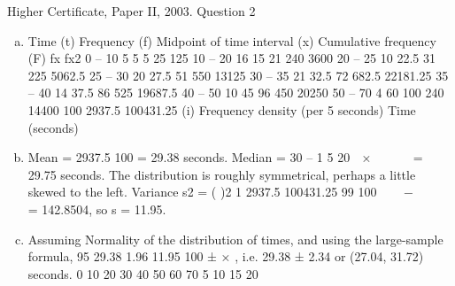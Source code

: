 \documentclass[a4paper,12pt]{article}
\begin{document}
Higher Certificate, Paper II, 2003. Question 2
\begin{enumerate}[(a)]
\item Time (t) Frequency (f) Midpoint of
time interval
(x)
Cumulative
frequency (F)
fx fx2
0 – 10 5 5 5 25 125
10 – 20 16 15 21 240 3600
20 – 25 10 22.5 31 225 5062.5
25 – 30 20 27.5 51 550 13125
30 – 35 21 32.5 72 682.5 22181.25
35 – 40 14 37.5 86 525 19687.5
40 – 50 10 45 96 450 20250
50 – 70 4 60 100 240 14400
100 2937.5 100431.25
(i) Frequency density (per 5 seconds)
Time (seconds)
\item  Mean = 2937.5
100
= 29.38 seconds. Median = 30 – 1 5
20
 ×   
 
= 29.75 seconds.
The distribution is roughly symmetrical, perhaps a little skewed to the left.
Variance s2 = ( )2 1 2937.5 100431.25
99 100
 
 − 
 
 
= 142.8504, so s = 11.95.
\item  Assuming Normality of the distribution of times, and using the large-sample
formula, 95%
29.38 1.96 11.95
100
± × , i.e. 29.38 ± 2.34 or (27.04, 31.72) seconds.
0 10 20 30 40 50 60 70
5
10
15
20
\end{enumerate}
\end{document}
